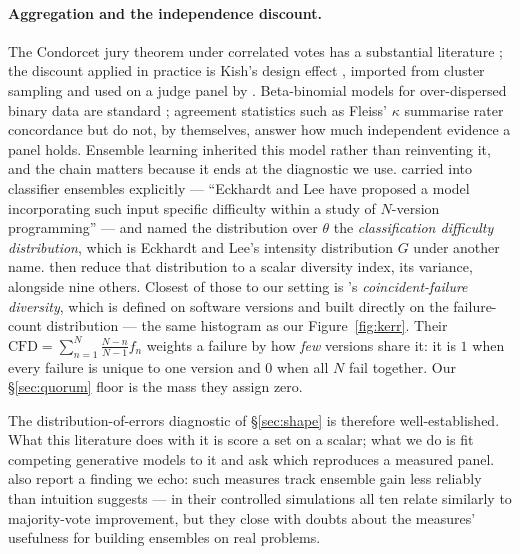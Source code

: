 \documentclass[11pt,a4paper]{article}
\begin{document}
\paragraph{Aggregation and the independence discount.}
The Condorcet jury theorem under correlated votes has a substantial literature
\citep{ladha1992,boland1989}; the discount applied in practice is Kish's design
effect \citep{kish1965}, imported from cluster sampling and used on a judge panel
by \citet{kohli2026}. Beta-binomial
models for over-dispersed binary data are standard \citep{williams1975}; agreement
statistics such as Fleiss' $\kappa$ \citep{fleiss1971} summarise rater
concordance but do not, by themselves, answer how much independent evidence a
panel holds. Ensemble learning inherited this model rather than reinventing it, and the chain
matters because it ends at the diagnostic we use. \citet{hansen1990} carried
\citet{eckhardt1985} into classifier ensembles explicitly --- ``Eckhardt and Lee
have proposed a model incorporating such input specific difficulty within a study
of $N$-version programming'' --- and named the distribution over $\theta$ the
\emph{classification difficulty distribution}, which is Eckhardt and Lee's
intensity distribution $G$ under another name. \citet{kuncheva2003} then reduce
that distribution to a scalar diversity index, its variance, alongside nine
others. Closest of those to our setting is \citet{partridge1997}'s
\emph{coincident-failure diversity}, which is defined on software versions and
built directly on the failure-count distribution --- the same histogram as our
Figure~\ref{fig:kerr}. Their $\mathrm{CFD} = \sum_{n=1}^{N}\frac{N-n}{N-1}f_n$
weights a failure by how \emph{few} versions share it: it is $1$ when every
failure is unique to one version and $0$ when all $N$ fail together. Our
\S\ref{sec:quorum} floor is the mass they assign zero.

The distribution-of-errors diagnostic of \S\ref{sec:shape} is therefore
well-established. What this literature does with it is score a set on a scalar;
what we do is fit competing generative models to it and ask which reproduces a
measured panel. \citet{kuncheva2003} also report a finding we
echo: such measures track ensemble gain less reliably than intuition suggests ---
in their controlled simulations all ten relate similarly to majority-vote
improvement, but they close with doubts about the measures' usefulness for
building ensembles on real problems.
\end{document}

